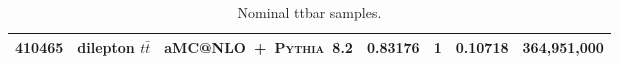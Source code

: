 \begin{table}[!htb]
{\begin{tabular}{rllS[table-format=3.2]lS[table-format=3.2]r}
      410465 & dilepton    $t\bar{t}$         & aMC@NLO~+~\textsc{Pythia}~8.2 & 0.83176 & 1 & 0.10718 & 364,951,000  \\  %
      \bottomrule
    \end{tabular}
  }
  \caption{Nominal ttbar samples.}
  \label{tab:ttbar-nominal}
\end{table}